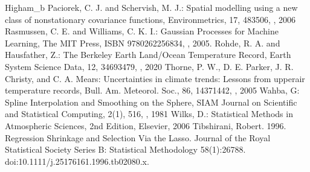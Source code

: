 \documentclass[letterpaper,10pt,english]{sphinxmanual}
\begin{document}
\begin{sphinxthebibliography}{Higham\_b}
\sphinxAtStartPar
Paciorek, C. J. and Schervish, M. J.: Spatial modelling using a new class of nonstationary covariance functions, Environmetrics, 17, 483\textendash{}506, , 2006
\sphinxAtStartPar
Rasmussen, C. E. and Williams, C. K. I.: Gaussian Processes for Machine Learning, The MIT Press, ISBN 978\sphinxhyphen{}0\sphinxhyphen{}262\sphinxhyphen{}25683\sphinxhyphen{}4, , 2005.
\sphinxAtStartPar
Rohde, R. A. and Hausfather, Z.: The Berkeley Earth Land/Ocean Temperature Record, Earth System Science Data, 12, 3469\textendash{}3479, , 2020
\sphinxAtStartPar
Thorne, P. W., D. E. Parker, J. R. Christy, and C. A. Mears: Uncertainties in climate trends: Lessons from upper\sphinxhyphen{}air temperature records, Bull. Am. Meteorol. Soc., 86, 1437\textendash{}1442, , 2005
\sphinxAtStartPar
Wahba, G: Spline Interpolation and Smoothing on the Sphere, SIAM Journal on
Scientific and Statistical Computing, 2(1), 5\sphinxhyphen{}16, , 1981
\sphinxAtStartPar
Wilks, D.: Statistical Methods in Atmospheric Sciences, 2nd Edition, Elsevier, 2006
\sphinxAtStartPar
Tibshirani, Robert. 1996. Regression Shrinkage and Selection Via the Lasso. Journal of the Royal Statistical Society Series B: Statistical Methodology 58(1):267\textendash{}88. doi:10.1111/j.2517\sphinxhyphen{}6161.1996.tb02080.x.
\end{sphinxthebibliography}
\end{document}
